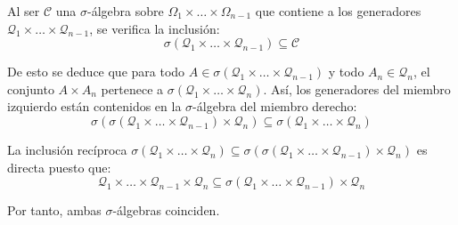 \begin{problema}
Al ser $\mathcal{C}$ una $\sigma$-álgebra sobre $\Omega_1 \times \dots \times \Omega_{n-1}$ que contiene a los generadores $\mathcal{Q}_1 \times \dots \times \mathcal{Q}_{n-1}$, se verifica la inclusión:
\[
    \sigma(\mathcal{Q}_1 \times \dots \times \mathcal{Q}_{n-1}) \subseteq \mathcal{C}
\]

De esto se deduce que para todo $A \in \sigma(\mathcal{Q}_1 \times \dots \times \mathcal{Q}_{n-1})$ y todo $A_n \in \mathcal{Q}_n$, el conjunto $A \times A_n$ pertenece a $\sigma(\mathcal{Q}_1 \times \dots \times \mathcal{Q}_n)$. Así, los generadores del miembro izquierdo están contenidos en la $\sigma$-álgebra del miembro derecho:
\[
    \sigma\left(\sigma(\mathcal{Q}_1 \times \dots \times \mathcal{Q}_{n-1}) \times \mathcal{Q}_n\right) \subseteq \sigma(\mathcal{Q}_1 \times \dots \times \mathcal{Q}_n)
\]

La inclusión recíproca $\sigma(\mathcal{Q}_1 \times \dots \times \mathcal{Q}_n) \subseteq \sigma\left(\sigma(\mathcal{Q}_1 \times \dots \times \mathcal{Q}_{n-1}) \times \mathcal{Q}_n\right)$ es directa puesto que:
\[
    \mathcal{Q}_1 \times \dots \times \mathcal{Q}_{n-1} \times \mathcal{Q}_n \subseteq \sigma(\mathcal{Q}_1 \times \dots \times \mathcal{Q}_{n-1}) \times \mathcal{Q}_n
\]

Por tanto, ambas $\sigma$-álgebras coinciden.
\end{problema}
\newpage
